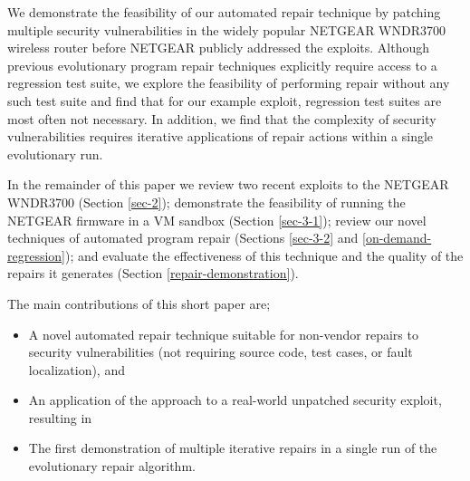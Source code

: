 \documentclass{sigcomm-alternate}
\begin{document}

We demonstrate the feasibility of our automated repair technique by
patching multiple security vulnerabilities in the widely popular NETGEAR
WNDR3700 wireless router before NETGEAR publicly addressed the
exploits.  Although previous evolutionary program repair techniques
explicitly require access to a regression test suite, we explore the
feasibility of performing repair without any such test suite and find
that for our example exploit, regression test suites are most often
not necessary. In addition, we find that the complexity of security
vulnerabilities requires iterative applications of repair actions
within a single evolutionary run.

In the remainder of this paper we review two recent exploits to the
NETGEAR WNDR3700 (Section \ref{sec-2}); demonstrate the feasibility
of running the NETGEAR firmware in a VM sandbox (Section \ref{sec-3-1});
review our novel techniques of automated program repair (Sections
\ref{sec-3-2} and \ref{on-demand-regression}); and evaluate the effectiveness of this
technique and the quality of the repairs it generates (Section
\ref{repair-demonstration}).

The main  contributions of this short paper are;
\begin{itemize}
\item A novel automated repair technique suitable for non-vendor repairs to
security vulnerabilities (not requiring source code, test cases, or fault
localization), and 
\item An application of the approach to a real-world unpatched
security exploit, resulting in
\item The first demonstration of multiple iterative repairs in a single
run of the evolutionary repair algorithm.
\end{itemize}
\end{document}
